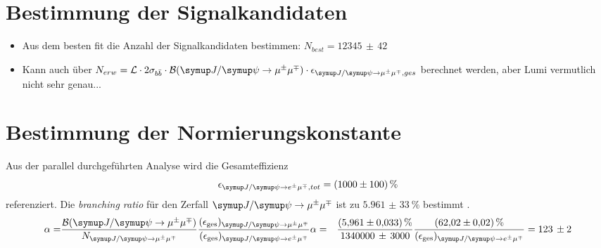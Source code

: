 \section{Bestimmung der Signalkandidaten}
%
\begin{itemize}
  \item Aus dem besten fit die Anzahl der Signalkandidaten bestimmen: $N_{best}=12345\,\pm\,42$
  \item Kann auch über $N_{erw}=\mathcal{L}\cdot 2\sigma_{b\bar{b}}\cdot\mathcal{B}(\kontroll)\cdot\epsilon_{\kontroll, ges}$ berechnet werden, aber Lumi vermutlich nicht sehr genau...
\end{itemize}
%
\section{Bestimmung der Normierungskonstante}
%
Aus der parallel durchgeführten Analyse \cite{ba-maik} wird die Gesamteffizienz
%
\begin{equation}
  \epsilon_{\signal, tot}=\SI{1000(100)}{\percent}
\end{equation}
%
referenziert. Die \textit{branching ratio} für den Zerfall $\kontroll$ ist zu $\SI{5,961(33)}{\percent}$ bestimmt \cite{pdg}.
%
\begin{align*}
  \alpha=&\frac{\mathcal{B}(\kontroll)}{N_{\kontroll}}\frac{(\epsilon_{\text{ges}})_{\kontroll}}{(\epsilon_{\text{ges}})_{\signal}}
  \alpha=&\frac{\SI{5,961(33)}{\percent}}{1340000\,\pm\,3000}\frac{\SI{62,02(2)}{\percent}}{(\epsilon_{\text{ges}})_{\signal}}=123\,\pm2
  \label{eq:ergebnis}
\end{align*}
%
